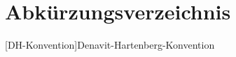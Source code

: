 \chapter*{Abkürzungsverzeichnis}

\begin{acronym}
 [DH-Konvention]{Denavit-Hartenberg-Konvention}
\end{acronym}

